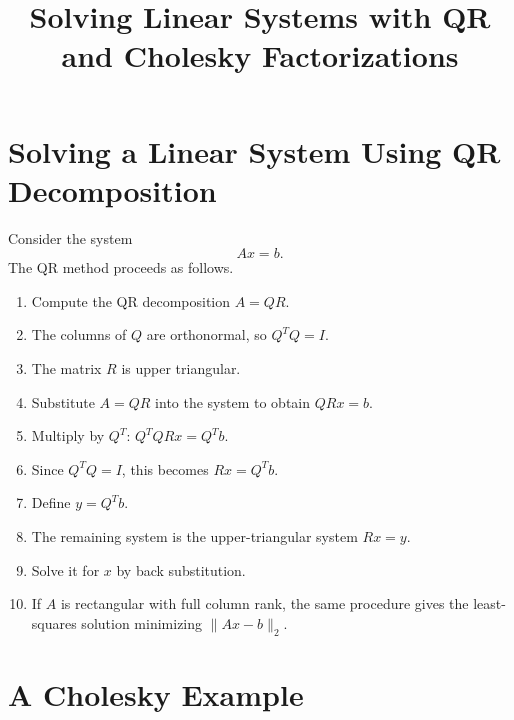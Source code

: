 \documentclass[11pt]{article}
\title{Solving Linear Systems with QR and Cholesky Factorizations}
\author{}
\date{}
\begin{document}
\maketitle

\section{Solving a Linear System Using QR Decomposition}

Consider the system
\[
Ax=b.
\]
The QR method proceeds as follows.
\begin{enumerate}
  \item Compute the QR decomposition $A=QR$.
  \item The columns of $Q$ are orthonormal, so $Q^TQ=I$.
  \item The matrix $R$ is upper triangular.
  \item Substitute $A=QR$ into the system to obtain $QRx=b$.
  \item Multiply by $Q^T$: $Q^TQRx=Q^Tb$.
  \item Since $Q^TQ=I$, this becomes $Rx=Q^Tb$.
  \item Define $y=Q^Tb$.
  \item The remaining system is the upper-triangular system $Rx=y$.
  \item Solve it for $x$ by back substitution.
  \item If $A$ is rectangular with full column rank, the same procedure gives the least-squares solution minimizing $\lVert Ax-b\rVert_2$.
\end{enumerate}

\section{A Cholesky Example}
\end{document}
